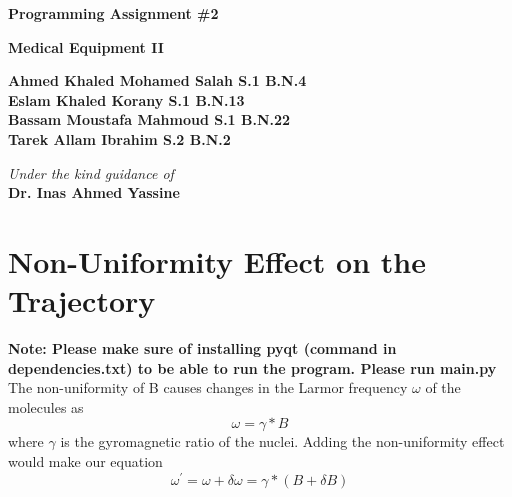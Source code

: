 \documentclass[18pt]{extarticle}
\begin{document}
\begin{center}
	\begin{LARGE}			\bf{Programming Assignment \#2\\}
	\end{LARGE}
	\vspace*{30pt}
	
	
	\vspace{20pt}
	\textbf{Medical Equipment II\\}
	\vspace{40pt}
	
	\textbf{
		Ahmed Khaled Mohamed Salah \hspace*{10mm} S.1  B.N.4\\
		Eslam Khaled Korany \hspace*{26mm} S.1  B.N.13\\
		Bassam Moustafa Mahmoud \hspace*{15mm} S.1  B.N.22\\
		Tarek Allam Ibrahim \hspace*{26mm} S.2  B.N.2\\
	}
		\vspace{30pt}

	\vspace{30pt}
	\textit{Under the kind guidance of}\\
	\textbf{Dr. Inas Ahmed Yassine
	}\\
	
	
	\vspace{20pt}
	
	
	

\end{center}
\pagebreak



\section{Non-Uniformity Effect on the Trajectory}
\textbf{Note: Please make sure of installing pyqt (command in dependencies.txt) to be able to run the program. Please run main.py}
\\The non-uniformity of B causes changes in the Larmor frequency $\omega$ of the molecules as
\begin{equation*}
\omega = \gamma * B
\end{equation*}
where $\gamma$ is the gyromagnetic ratio of the nuclei.
Adding the non-uniformity effect would make our equation
\begin{equation*}
\omega ^{'} = \omega + \delta \omega = \gamma * (B + \delta B)
\end{equation*}
\end{document}
